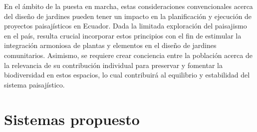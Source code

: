 \documentclass[12pt]{article}
\begin{document}
En el ámbito de la puesta en marcha, estas consideraciones convencionales acerca del diseño de jardines pueden tener un impacto en la planificación y ejecución de proyectos paisajísticos en Ecuador. Dada la limitada exploración del paisajismo en el país, resulta crucial incorporar estos principios con el fin de estimular la integración armoniosa de plantas y elementos en el diseño de jardines comunitarios. Asimismo, se requiere crear conciencia entre la población acerca de la relevancia de su contribución individual para preservar y fomentar la biodiversidad en estos espacios, lo cual contribuirá al equilibrio y estabilidad del sistema paisajístico. \\
\newpage
\section{Sistemas propuesto}
\end{document}
